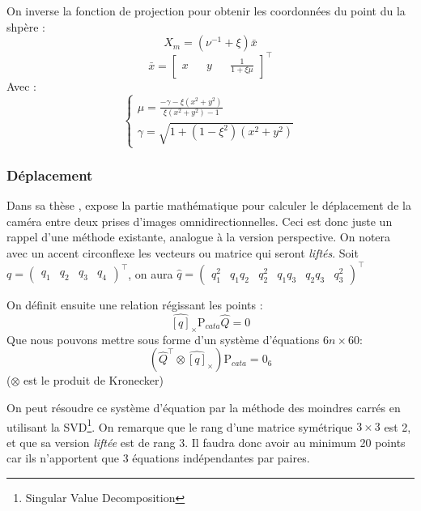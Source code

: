 On inverse la fonction de projection pour obtenir les coordonnées du point du la shpère :
\begin{equation}
X_m = (\nu^{-1} + \xi) \bar{x}
\end{equation}
\begin{equation}
\bar{x} = \begin{bmatrix}x && y && \frac{1}{1+\xi \mu} \end{bmatrix}^{\top}
\end{equation}
Avec :
\begin{equation}
  \left \{
  \begin{matrix}
    \mu = \frac{-\gamma-\xi(x^2+y^2)}{\xi(x^2+y^2)-1} \\
    \gamma = \sqrt{1+(1-\xi^2)(x^2+y^2)}
  \end{matrix}
 \right.
\end{equation}

\subsubsection{Déplacement}

Dans sa thèse \cite{Puig11PhD}, \citeauthor{Puig11PhD} expose la partie mathématique pour calculer le déplacement de la caméra entre deux prises d'images omnidirectionnelles.
Ceci est donc juste un rappel d'une méthode existante, analogue à la version perspective.
On notera avec un accent circonflexe les vecteurs ou matrice qui seront \emph{liftés}.
Soit $q=\begin{pmatrix}q_1&q_2&q_3&q_4\end{pmatrix}^\top$, on aura $\hat{q} = \begin{pmatrix}q_1^2&q_1q_2&q_2^2&q_1q_3&q_2q_3&q_3^2\end{pmatrix}^\top$

On définit ensuite une relation régissant les points :
\begin{equation}
\widehat{[q]}_\times \text{P}_{cata} \hat{Q} = 0
\end{equation}
Que nous pouvons mettre sous forme d'un système d'équations $6n\times60$:
\begin{equation}
\left( \hat{Q}^{\top} \otimes \widehat{[q]}_\times \right) \text{P}_{cata}  = 0_6
\end{equation}
($\otimes$ est le produit de Kronecker)

On peut résoudre ce système d'équation par la méthode des moindres carrés en utilisant la SVD\footnote{Singular Value Decomposition}.
On remarque que le rang d'une matrice symétrique $3\times3$ est 2, et que sa version \emph{liftée} est de rang 3.
Il faudra donc avoir au minimum 20 points car ils n'apportent que 3 équations indépendantes par paires.


